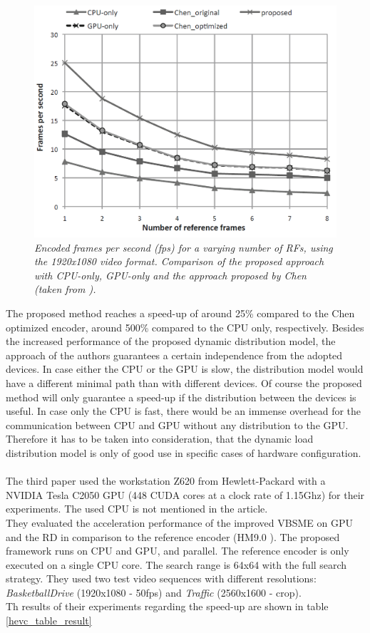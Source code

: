 \begin{figure}[H]
\centerline{\includegraphics[scale=0.3]{pics/dynamic_model_result}} %
\caption{\label{dynamic_model_result}{\it Encoded frames per second (fps)
 for a varying number of RFs, using the 1920x1080  video format.
  Comparison of the proposed approach with CPU-only, GPU-only and the
  approach proposed by Chen (taken from \cite{Paper2}).}}
\end{figure}

The proposed method reaches a speed-up of around 25\% compared to the Chen optimized encoder, around 500\% compared to the CPU only, respectively. Besides the increased performance of the proposed dynamic distribution model, the approach of the authors guarantees a certain independence from the adopted devices. In case either the CPU or the GPU is slow, the distribution model would have a different minimal path than with different devices. Of course the proposed method will only guarantee a speed-up if the distribution between the devices is useful. In case only the CPU is fast, there would be an immense overhead for the communication between CPU and GPU without any distribution to the GPU. 
Therefore it has to be taken into consideration, that the dynamic load distribution model is only of good use in specific cases of hardware configuration.\\
\\ 
The third paper \cite{Paper3} used the workstation Z620 from Hewlett-Packard with a NVIDIA Tesla C2050 GPU (448 CUDA cores at a clock rate of 1.15Ghz) for their experiments. The used CPU is not mentioned in the article.\\
They evaluated the acceleration performance of the improved VBSME on GPU and the RD in comparison to the reference encoder (HM9.0 \cite{hmencoder}). The proposed framework runs on CPU and GPU,  and parallel. 
The reference encoder is only executed on a single CPU core. The search range is 64x64 with the full search strategy. They used two test video sequences with different
resolutions: \textit{BasketballDrive} (1920x1080 - 50fps) and
\textit{Traffic} (2560x1600 - crop).\\
Th results of their experiments regarding the speed-up are shown in table \ref{hevc_table_result}

